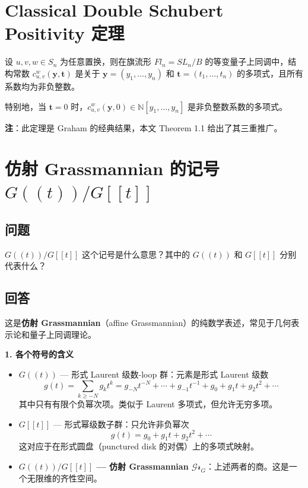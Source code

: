 \section{Classical Double Schubert Positivity 定理}\label{th:ClassicalDoublePositivity}
\begin{Theorem}
设 $u, v, w \in S_n$ 为任意置换，则在旗流形 $Fl_n = SL_n/B$ 的等变量子上同调中，结构常数 $c^{w}_{u,v}(\mathbf{y}, \mathbf{t})$ 是关于 $\mathbf{y} = (y_1, \dots, y_n)$ 和 $\mathbf{t} = (t_1, \dots, t_n)$ 的多项式，且所有系数均为非负整数。

特别地，当 $\mathbf{t} = 0$ 时，$c^{w}_{u,v}(\mathbf{y}, 0) \in \mathbb{N}[y_1, \dots, y_n]$ 是非负整数系数的多项式。
\end{Theorem}

\textbf{注}：此定理是 Graham \cite{Gr} 的经典结果，本文 Theorem 1.1 给出了其三重推广。

\section{仿射 Grassmannian 的记号 $G((t))/G[[t]]$}\label{sec:AffineGrassmannian}
\subsection{问题}
$G((t))/G[[t]]$ 这个记号是什么意思？其中的 $G((t))$ 和 $G[[t]]$ 分别代表什么？
\subsection{回答}
这是\textbf{仿射 Grassmannian}（affine Grassmannian）的纯数学表述，常见于几何表示论和量子上同调理论。

\textbf{1. 各个符号的含义}

\begin{itemize}
\item \textbf{$G((t))$} — 形式 Laurent 级数\--loop 群：元素是形式 Laurent 级数
$$g(t) = \sum_{k \geq -N} g_k t^k = g_{-N}t^{-N} + \cdots + g_{-1}t^{-1} + g_0 + g_1 t + g_2 t^2 + \cdots$$
其中只有有限个负幂次项。类似于 Laurent 多项式，但允许无穷多项。

\item \textbf{$G[[t]]$} — 形式幂级数子群：只允许非负幂次
$$g(t) = g_0 + g_1 t + g_2 t^2 + \cdots$$
这对应于在形式圆盘（punctured disk 的对偶）上的多项式映射。

\item \textbf{$G((t))/G[[t]]$ — 仿射 Grassmannian $\mathcal{Gr}_G$}：上述两者的商。这是一个无限维的齐性空间。
\end{itemize}

